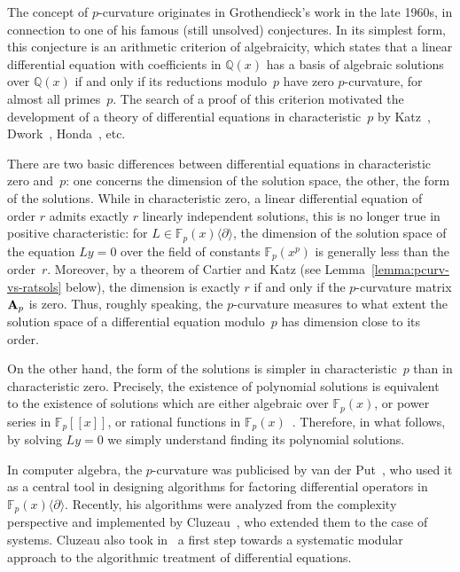 \documentclass{sig-alternate}
\def\F {\mathbb{F}}
\def\mA {\ensuremath{{\bf A}}}
\begin{document}
The concept of $p$-curvature originates in Grothendieck's work in the
late 1960s, in connection to one of his famous (still unsolved)
conjectures. In its simplest form, this conjecture is an arithmetic
criterion of algebraicity, which states that a linear differential
equation with coefficients in $\mathbb{Q}(x)$ has a basis of algebraic
solutions over $\mathbb{Q}(x)$ if and only if its reductions
modulo~$p$ have zero $p$-curvature, for almost all primes~$p$. The
search of a proof of this criterion motivated the development of a
theory of differential equations in characteristic~$p$ by
Katz~\cite{Katz70}, Dwork~\cite{Dwork82}, Honda~\cite{Honda81}, etc.

There are two basic differences between differential equations in
characteristic zero and~$p$: one concerns the dimension of the
solution space, the other, the form of the solutions. While in
characteristic zero, a linear differential equation of order $r$
admits exactly $r$ linearly independent solutions, this is no longer
true in positive characteristic: for $L\in \F_p(x)\langle \partial
\rangle$, the dimension of the solution space of the equation $Ly=0$
over the field of constants $\F_p(x^p)$ is generally less than the
order~$r$. Moreover, by a theorem of Cartier and Katz (see
Lemma~\ref{lemma:pcurv-vs-ratsols} below), the dimension is exactly
$r$ if and only if the $p$-curvature matrix $\mA_p$ is zero. Thus,
roughly speaking, the $p$-curvature measures to what extent the
solution space of a differential equation modulo~$p$ has dimension
close to its order. 

On the other hand, the form of the solutions is simpler in
characteristic~$p$ than in characteristic zero. Precisely, the
existence of polynomial solutions is equivalent to the existence of
solutions which are either algebraic over $\F_p(x)$, or power series
in $\F_p[[x]]$, or rational functions in $\F_p(x)$~\cite{Honda81}.
Therefore, in what follows, by solving $Ly=0$ we simply understand
finding its polynomial solutions.

In computer algebra, the $p$-curvature was publicised by van der
Put~\cite{vanDerPut95,vanDerPut96}, who used it as a central tool in
designing algorithms for factoring differential operators in
$\F_p(x)\langle \partial \rangle$. Recently, his algorithms were
analyzed from the complexity perspective and implemented by
Cluzeau~\cite{Cluzeau03}, who extended them to the case of
systems. Cluzeau also took in~\cite{Cluzeau04} a first step towards a
systematic modular approach to the algorithmic treatment of
differential equations.
\end{document}
